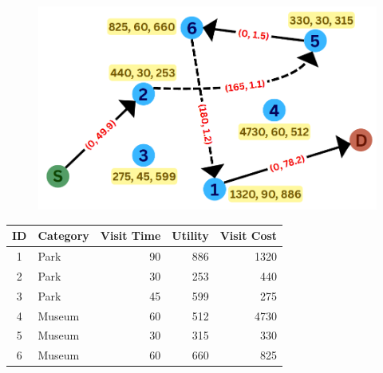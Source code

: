\begin{figure}[t]
	\centering
    \includegraphics[width=0.75\columnwidth]{plots/updatedExample.png}
	\label{fig:example_graph}
\end{figure}

\begin{table}[t]
	\centering
	\resizebox{0.85\columnwidth}{!}
	{
		\begin{tabular}{c l rrr}
			\toprule
			\textbf{ID} & \textbf{Category} & \textbf{Visit Time} & \textbf{Utility} & \textbf{Visit Cost} \\
			\midrule
			1 & Park        & 90 & 886 & 1320 \\
			2 & Park        & 30 & 253 & 440  \\
			3 & Park        & 45 & 599 & 275  \\
			4 & Museum      & 60 & 512 & 4730 \\
			5 & Museum      & 30 & 315 & 330  \\
			6 & Museum      & 60 & 660 & 825  \\
			\bottomrule
		\end{tabular}
	}
	\label{tab:example_poi}
\end{table}

